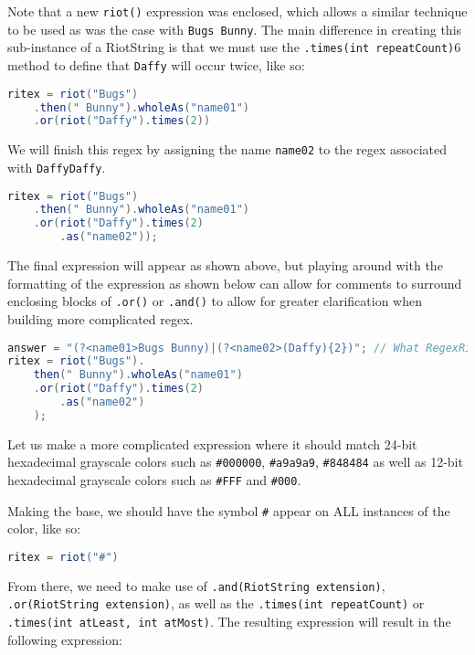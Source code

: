\documentclass[conference]{IEEEtran}
\begin{document}
Note that a new \texttt{riot()} expression was enclosed, which allows a similar
technique to be used as was the case with \texttt{Bugs Bunny}. The main
difference in creating this sub-instance of a RiotString is that we must
use the \texttt{.times(int repeatCount)}6 method to define that \texttt{Daffy} will
occur twice, like so:

\begin{lstlisting}[language=Java]
ritex = riot("Bugs")
    .then(" Bunny").wholeAs("name01")
    .or(riot("Daffy").times(2))
\end{lstlisting}

We will finish this regex by assigning the name \texttt{name02}
to the regex associated with \texttt{DaffyDaffy}.

\begin{lstlisting}[language=Java]
ritex = riot("Bugs")
    .then(" Bunny").wholeAs("name01")
    .or(riot("Daffy").times(2)
        .as("name02"));
\end{lstlisting}

The final expression will appear as shown above, but playing around with
the formatting of the expression as shown below can allow for comments
to surround enclosing blocks of \texttt{.or()} or \texttt{.and()} to allow for
greater clarification when building more complicated regex.

\begin{lstlisting}[language=Java]
answer = "(?<name01>Bugs Bunny)|(?<name02>(Daffy){2})"; // What RegexRiot would generate
ritex = riot("Bugs").
    then(" Bunny").wholeAs("name01")
    .or(riot("Daffy").times(2)
        .as("name02")
    );
\end{lstlisting}

Let us make a more complicated expression where it should match 24-bit
hexadecimal grayscale colors such as \texttt{\#000000}, \texttt{\#a9a9a9},
\texttt{\#848484} as well as 12-bit hexadecimal grayscale colors such as
\texttt{\#FFF} and \texttt{\#000}.

Making the base, we should have the symbol \texttt{\#} appear on ALL instances
of the color, like so:

\begin{lstlisting}[language=Java]
ritex = riot("#")
\end{lstlisting}

From there, we need to make use of \texttt{.and(RiotString extension)},
\texttt{.or(RiotString extension)}, as well as the
\texttt{.times(int repeatCount)} or \texttt{.times(int atLeast, int atMost)}.
The resulting expression will result in the following expression:
\end{document}
